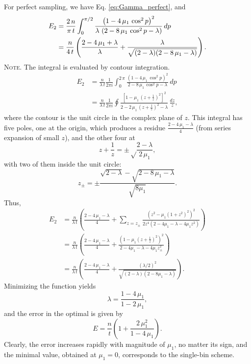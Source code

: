 \documentclass[reprint]{revtex4-1}
\newcommand{\note}[1]{{\color{DarkGreen}\footnotesize \textsc{Note.} #1}}
\newcommand{\Err}{E}
\begin{document}
For perfect sampling,
we have Eq. \eqref{eq:Gamma_perfect}, and
$$
\begin{aligned}
\Err_2
&=
\frac{2 \, n}{\pi \, t}
\int_0^{\pi/2}
\frac{ \left(1 - 4 \, \mu_1 \, \cos^2 p \right)^2 }
{ \lambda \, \left(2 - 8 \, \mu_1 \, \cos^2 p - \lambda \right) }
\, dp
\notag \\
&=
\frac{n}{4 \, t}
\left(
  \frac{2 - 4 \, \mu_1 + \lambda}{ \lambda }
  +
  \frac{ \lambda }
  { \sqrt{ (2 - \lambda) (2 - 8 \, \mu_1 - \lambda) } }
\right).
\end{aligned}
$$
\note{The integral is evaluated by contour integration.
$$
\begin{aligned}
\Err_2
&=
\frac{n}{\lambda \, t}
\frac{1}{2 \pi i}
\int_0^{2 \, \pi}
\frac{ \left(1 - 4 \, \mu_1 \, \cos^2 p \right)^2 }
{ 2 - 8 \, \mu_1 \, \cos^2 p - \lambda }
\, dp
\\
&=
\frac{n}{\lambda \, t}
\frac{1}{2 \pi i}
\oint
\frac{ \left[1 - \mu_1 \, \left(z+\frac{1}{z}\right)^2 \right]^2 }
{ 2 - 2 \, \mu_1 \, \left(z + \frac{1}{z}\right)^2 - \lambda }
\, \frac{dz}{z},
\end{aligned}
$$
where the contour is the unit circle
in the complex plane of $z$.
%
This integral has five poles, one at the origin,
which produces a residue $\frac{2 - 4 \, \mu_1 - \lambda}{4}$
(from series expansion of small $z$),
and the other four at
$$
z + \frac{1}{z} = \pm\sqrt\frac{2-\lambda}{2 \, \mu_1},
$$
with two of them inside the unit circle:
$$
z_\pm = \pm \frac{\sqrt{2-\lambda} -\sqrt{2 - 8 \, \mu_1 - \lambda}}
{\sqrt{8 \mu_1}}.
$$
Thus,
$$
\begin{aligned}
\Err_2
&=
\frac{n}{\lambda \, t}
\left(
 \frac{2 - 4 \, \mu_1 - \lambda}{4}
 +
 \sum_{z = z_{\pm} }
 \frac{ \left(z^2 - \mu_1 (1 + z^2)^2 \right)^2 }
 { 2 z^4 (2 - 4 \mu_1 - \lambda - 4 \mu_1 z^2) }
\right)
\\
&=
\frac{n}{\lambda \, t}
\left(
  \frac{2 - 4 \, \mu_1 - \lambda}{4}
 +
 \frac{ \left(1 - \mu_1 \left(z + \frac{1}{z} \right)^2 \right)^2 }
 { 2 - 4 \mu_1 - \lambda - 4 \mu_1 z_{\pm}^2 }
\right)
\\
&=
\frac{n}{\lambda \, t}
\left(
  \frac{2 - 4 \, \mu_1 - \lambda}{4}
 +
 \frac{ (\lambda/2)^2 }
 { \sqrt{(2-\lambda) (2 - 8 \mu_1 -\lambda)} }
\right).
\end{aligned}
$$
}
%
Minimizing the function yields
%
\begin{equation}
\lambda = \frac{1 - 4 \, \mu_1} { 1 - 2 \, \mu_1 },
\label{eq:lambda_tridiag_perfect}
\end{equation}
%
and the error in the optimal is given by
%
\begin{equation}
\Err
=
\frac{n}{t}
\left(
  1+ \frac{2 \, \mu_1^2}{1-4 \, \mu_1}
\right).
\label{eq:error_tridiag_prefect}
\end{equation}
%
Clearly, the error
increases rapidly with magnitude of $\mu_1$,
no matter its sign,
and the minimal value, obtained at $\mu_1 = 0$,
corresponds to the single-bin scheme.
\end{document}
